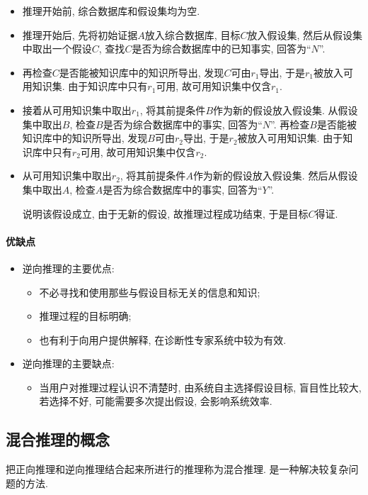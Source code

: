 \begin{itemize}
\item 推理开始前, 综合数据库和假设集均为空.
\item 推理开始后, 先将初始证据$A$放入综合数据库, 目标$C$放入假设集, 然后从假设集中取出一个假设$C$, 查找$C$是否为综合数据库中的已知事实, 回答为“$N$”.
\item 再检查$C$是否能被知识库中的知识所导出, 发现$C$可由$r_1$导出, 于是$r_1$被放入可用知识集. 由于知识库中只有$r_1$可用, 故可用知识集中仅含$r_1$.
\item 接着从可用知识集中取出$r_1$, 将其前提条件$B$作为新的假设放入假设集. 从假设集中取出$B$, 检查$B$是否为综合数据库中的事实, 回答为“$N$”. 再检查$B$是否能被知识库中的知识所导出, 发现$B$可由$r_2$导出, 于是$r_2$被放入可用知识集. 由于知识库中只有$r_2$可用, 故可用知识集中仅含$r_2$.
\item 从可用知识集中取出$r_2$, 将其前提条件$A$作为新的假设放入假设集. 然后从假设集中取出$A$, 检查$A$是否为综合数据库中的事实, 回答为“$Y$”.

    说明该假设成立, 由于无新的假设, 故推理过程成功结束, 于是目标$C$得证.
\end{itemize}
\paragraph{优缺点}
\begin{itemize}
\item 逆向推理的主要优点:
\begin{itemize}
\item 不必寻找和使用那些与假设目标无关的信息和知识;
\item 推理过程的目标明确;
\item 也有利于向用户提供解释, 在诊断性专家系统中较为有效.
\end{itemize}
\end{itemize}

\begin{itemize}
\item 逆向推理的主要缺点:
\begin{itemize}
\item 当用户对推理过程认识不清楚时, 由系统自主选择假设目标, 盲目性比较大, 若选择不好, 可能需要多次提出假设, 会影响系统效率.
\end{itemize}
\end{itemize}
\subsection{混合推理的概念}
把正向推理和逆向推理结合起来所进行的推理称为混合推理. 是一种解决较复杂问题的方法.
